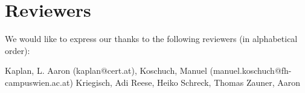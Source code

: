 \section{Reviewers}

We would like to express our thanks to the following reviewers (in alphabetical order):

Kaplan, L. Aaron (kaplan@cert.at), 
Koschuch, Manuel (manuel.koschuch@fh-campuswien.ac.at)
Kriegisch, Adi
Reese, Heiko
Schreck, Thomas
Zauner, Aaron


